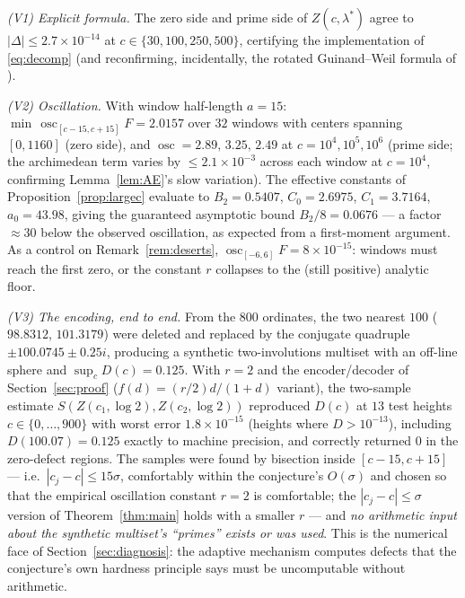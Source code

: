 \documentclass[11pt]{amsart}
\theoremstyle{definition}
\theoremstyle{remark}
\DeclareMathOperator{\osc}{osc}
\begin{document}
\emph{(V1) Explicit formula.} The zero side and prime side of $Z(c,\lambda^*)$ agree to $|\Delta|\le2.7\times10^{-14}$ at $c\in\{30,100,250,500\}$, certifying the implementation of \eqref{eq:decomp} (and reconfirming, incidentally, the rotated Guinand--Weil formula of \cite{SI,ZS}).

\emph{(V2) Oscillation.} With window half-length $a=15$: $\min\,\osc_{[c-15,c+15]}F=2.0157$ over $32$ windows with centers spanning $[0,1160]$ (zero side), and $\osc=2.89,\,3.25,\,2.49$ at $c=10^4,10^5,10^6$ (prime side; the archimedean term varies by $\le2.1\times10^{-3}$ across each window at $c=10^4$, confirming Lemma~\ref{lem:AE}'s slow variation). The effective constants of Proposition~\ref{prop:largec} evaluate to $B_2=0.5407$, $C_0=2.6975$, $C_1=3.7164$, $a_0=43.98$, giving the guaranteed asymptotic bound $B_2/8=0.0676$ --- a factor $\approx30$ below the observed oscillation, as expected from a first-moment argument. As a control on Remark~\ref{rem:deserts}, $\osc_{[-6,6]}F=8\times10^{-15}$: windows must reach the first zero, or the constant $r$ collapses to the (still positive) analytic floor.

\emph{(V3) The encoding, end to end.} From the $800$ ordinates, the two nearest $100$ ($98.8312$, $101.3179$) were deleted and replaced by the conjugate quadruple $\pm100.0745\pm0.25i$, producing a synthetic two-involutions multiset with an off-line sphere and $\sup_cD(c)=0.125$. With $r=2$ and the encoder/decoder of Section~\ref{sec:proof} ($f(d)=(r/2)d/(1+d)$ variant), the two-sample estimate $S(Z(c_1,\log2),Z(c_2,\log2))$ reproduced $D(c)$ at $13$ test heights $c\in\{0,\dots,900\}$ with worst error $1.8\times10^{-15}$ (heights where $D>10^{-13}$), including $D(100.07)=0.125$ exactly to machine precision, and correctly returned $0$ in the zero-defect regions. The samples were found by bisection inside $[c-15,c+15]$ --- i.e.\ $|c_j-c|\le15\sigma$, comfortably within the conjecture's $O(\sigma)$ and chosen so that the empirical oscillation constant $r=2$ is comfortable; the $|c_j-c|\le\sigma$ version of Theorem~\ref{thm:main} holds with a smaller $r$ --- and \emph{no arithmetic input about the synthetic multiset's ``primes'' exists or was used}. This is the numerical face of Section~\ref{sec:diagnosis}: the adaptive mechanism computes defects that the conjecture's own hardness principle says must be uncomputable without arithmetic.
\end{document}
